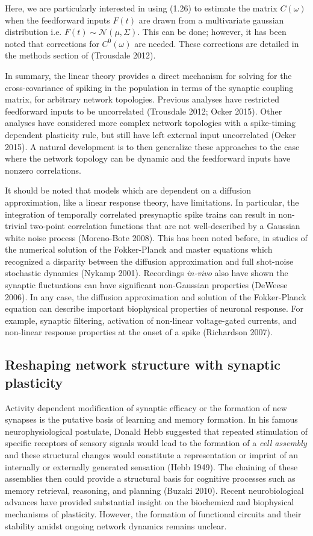 \documentclass{ucetd}
\begin{document}
Here, we are particularly interested in using (1.26) to estimate the matrix $C(\omega)$ when the feedforward inputs $F(t)$ are drawn from a multivariate gaussian distribution i.e. $F(t) \sim \mathcal{N}(\mu,\Sigma)$. This can be done; however, it has been noted that corrections for $C^{0}(\omega)$ are needed. These corrections are detailed in the methods section of (Trousdale 2012).

In summary, the linear theory provides a direct mechanism for solving for the cross-covariance of spiking in the population in terms of the synaptic coupling matrix, for arbitrary network topologies. Previous analyses have restricted feedforward inputs to be uncorrelated (Trousdale 2012; Ocker 2015). Other analyses have considered more complex network topologies with a spike-timing dependent plasticity rule, but still have left external input uncorrelated (Ocker 2015). A natural development is to then generalize these approaches to the case where the network topology can be dynamic and the feedforward inputs have nonzero correlations.


It should be noted that models which are dependent on a diffusion approximation, like a linear response theory, have limitations. In particular, the integration of temporally correlated presynaptic spike trains can result in non-trivial two-point correlation functions that are not well-described by a Gaussian white noise process (Moreno-Bote 2008). This has been noted before, in studies of the numerical solution of the Fokker-Planck and master equations which recognized a disparity between the diffusion approximation and full shot-noise stochastic dynamics (Nykamp 2001). Recordings \emph{in-vivo} also have shown the synaptic fluctuations can have significant non-Gaussian properties (DeWeese 2006). In any case, the diffusion approximation and solution of the Fokker-Planck equation can describe important biophysical properties of neuronal response. For example, synaptic filtering, activation of non-linear voltage-gated currents, and non-linear response properties at the onset of a spike (Richardson 2007).

\subsection{Reshaping network structure with synaptic plasticity}

Activity dependent modification of synaptic efficacy or the formation of new synapses is the putative basis of learning and memory formation. In his famous neurophysiological postulate, Donald Hebb suggested that repeated stimulation of specific receptors of sensory signals would lead to the formation of a \emph{cell assembly} and these structural changes would constitute a representation or imprint of an internally or externally generated sensation (Hebb 1949). The chaining of these assemblies then could provide a structural basis for cognitive processes such as memory retrieval, reasoning, and planning (Buzaki 2010). Recent neurobiological advances have provided substantial insight on the biochemical and biophysical mechanisms of plasticity. However, the formation of functional circuits and their stability amidst ongoing network dynamics remains unclear.
\end{document}
